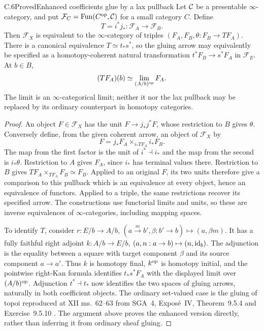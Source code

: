 \begin{statement}{C.6}{Proved}{Enhanced coefficients glue by a lax pullback}
Let $\mathcal C$ be a presentable $\infty$-category, and put $\mathcal F_C=\operatorname{Fun}(C^{\mathrm{op}},\mathcal C)$ for a small category $C$. Define
\[
 T=i^*j_*:\mathcal F_A\longrightarrow\mathcal F_B.
\]
Then $\mathcal F_X$ is equivalent to the $\infty$-category of triples $(F_A,F_B,\theta:F_B\to TF_A)$. There is a canonical equivalence $T\simeq t_*s^*$, so the gluing arrow may equivalently be specified as a homotopy-coherent natural transformation $t^*F_B\to s^*F_A$ in $\mathcal F_E$. At $b\in B$,
\[
 (TF_A)(b)\simeq\operatorname*{lim}_{(A/b)^{\mathrm{op}}}F_A.
\]
The limit is an $\infty$-categorical limit; neither it nor the lax pullback may be replaced by its ordinary counterpart in homotopy categories.
\end{statement}
\begin{proof}
An object $F\in\mathcal F_X$ has the unit $F\to j_*j^*F$, whose restriction to $B$ gives $\theta$. Conversely define, from the given coherent arrow, an object of $\mathcal F_X$ by
\[
 F=j_*F_A\mathop{\times}_{i_*TF_A}i_*F_B.
\]
The map from the first factor is the unit of $i^*\dashv i_*$ and the map from the second is $i_*\theta$. Restriction to $A$ gives $F_A$, since $i_*$ has terminal values there. Restriction to $B$ gives $TF_A\times_{TF_A}F_B\simeq F_B$. Applied to an original $F$, its two units therefore give a comparison to this pullback which is an equivalence at every object, hence an equivalence of functors. Applied to a triple, the same restrictions recover its specified arrow. The constructions use functorial limits and units, so these are inverse equivalences of $\infty$-categories, including mapping spaces.

To identify $T$, consider $r:E/b\to A/b$, $(a\xrightarrow{m}b',\beta:b'\to b)\mapsto(a,\beta m)$. It has a fully faithful right adjoint $k:A/b\to E/b$, $(a,n:a\to b)\mapsto(n,\mathrm{id}_b)$. The adjunction is the equality between a square with target component $\beta$ and its source component $a\to a'$. Thus $k$ is homotopy final, $k^{\mathrm{op}}$ is homotopy initial, and the pointwise right-Kan formula identifies $t_*s^*F_A$ with the displayed limit over $(A/b)^{\mathrm{op}}$. Adjunction $t^*\dashv t_*$ now identifies the two spaces of gluing arrows, naturally in both coefficient objects. The ordinary set-valued case is the gluing of topoi reproduced at XII ms.~62--63 from SGA~4, Expos\'e~IV, Theorem~9.5.4 and Exercise~9.5.10 \citep{CDSGA4}. The argument above proves the enhanced version directly, rather than inferring it from ordinary sheaf gluing.
\end{proof}

